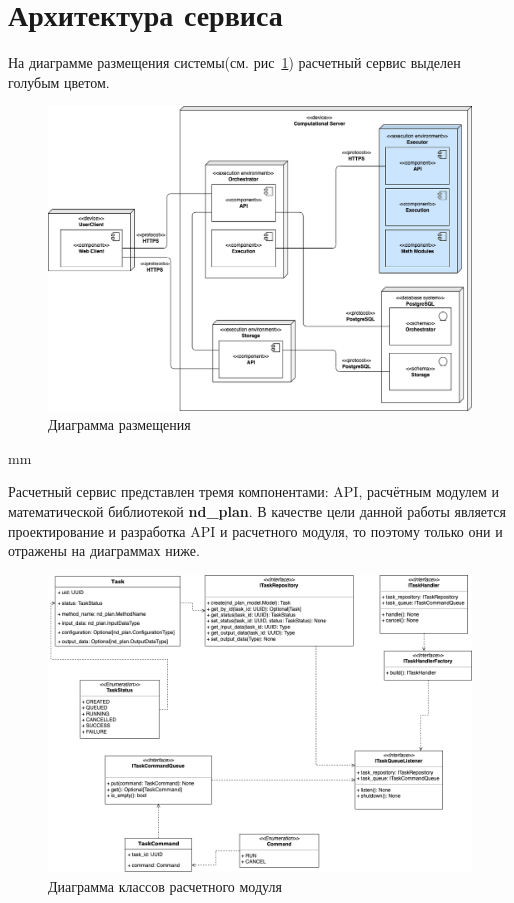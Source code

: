 \section*{\large{Архитектура сервиса}}

На диаграмме размещения системы(см. рис\ \ref{pic:architecture__deployment-diagram}) расчетный сервис выделен голубым цветом.

\begin{figure}[H]
	\hspace*{-1 cm}\includegraphics[width=\textwidth]{images/architecture/deployment_diagram}
	\caption{Диаграмма размещения}
	\label{pic:architecture__deployment-diagram}
\end{figure}
 mm

Расчетный сервис представлен тремя компонентами: API, расчётным модулем и математической библиотекой \textbf{nd\_plan}.
В качестве цели данной работы является проектирование и разработка API и расчетного модуля,
то поэтому только они и отражены на диаграммах ниже.

\begin{figure}[H]
	\hspace*{-2.5 cm}\includegraphics[width=1.2\textwidth]{images/architecture/execution_classes_diagram}
	\caption{Диаграмма классов расчетного модуля}
	\label{pic:architecture__execution-classes-diagram}
\end{figure}

